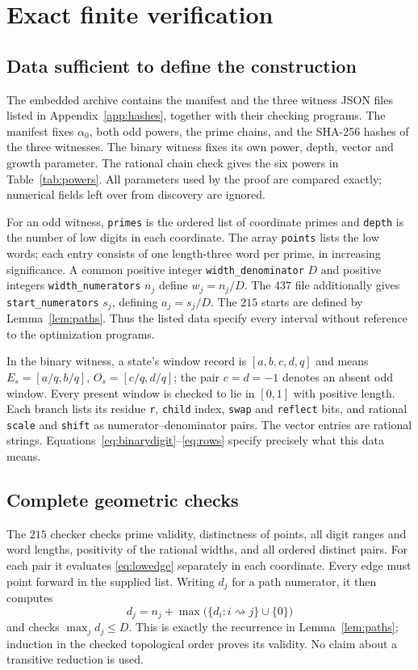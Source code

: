 \documentclass[11pt]{article}
\theoremstyle{definition}
\theoremstyle{remark}
\newcommand{\al}{\alpha_0}
\begin{document}
\section{Exact finite verification}\label{sec:verification}
\subsection{Data sufficient to define the construction}
The embedded archive contains the manifest and the three witness JSON files
listed in Appendix~\ref{app:hashes}, together with their checking programs.
The manifest fixes $\al$, both odd powers, the prime chains, and the
SHA-256 hashes of the three witnesses. The binary witness fixes its own
power, depth, vector and growth parameter. The rational chain check gives
the six powers in Table~\ref{tab:powers}. All parameters used by the proof
are compared exactly; numerical fields left over from discovery are ignored.

For an odd witness, \texttt{primes} is the ordered list of coordinate
primes and \texttt{depth} is the number of low digits in each coordinate.
The array \texttt{points} lists the low words; each entry consists of one
length-three word per prime, in increasing significance. A common positive
integer \texttt{width\_denominator} $D$ and positive integers
\texttt{width\_numerators} $n_j$ define $w_j=n_j/D$.
The $437$ file additionally gives \texttt{start\_numerators} $s_j$,
defining $a_j=s_j/D$. The $215$ starts are defined by
Lemma~\ref{lem:paths}. Thus the listed data specify every interval without
reference to the optimization programs.

In the binary witness, a state's window record is $[a,b,c,d,q]$ and means
$E_s=[a/q,b/q]$, $O_s=[c/q,d/q]$; the pair $c=d=-1$ denotes an absent
odd window. Every present window is checked to lie in $[0,1]$ with positive
length. Each branch lists its residue \texttt{r}, \texttt{child} index,
\texttt{swap} and \texttt{reflect} bits, and rational \texttt{scale} and
\texttt{shift} as numerator--denominator pairs. The vector entries are
rational strings. Equations~\eqref{eq:binarydigit}--\eqref{eq:rows} specify
precisely what this data means.

\subsection{Complete geometric checks}
The $215$ checker checks prime validity, distinctness of points, all digit
ranges and word lengths, positivity of the rational widths, and all
ordered distinct pairs. For each pair it evaluates \eqref{eq:lowedge}
separately in each coordinate. Every edge must point forward in the supplied
list. Writing $d_j$ for a path numerator, it then computes
\[
 d_j=n_j+\max\bigl(\{d_i:i\rightsquigarrow j\}\cup\{0\}\bigr)
\]
and checks $\max_jd_j\le D$. This is exactly the recurrence in
Lemma~\ref{lem:paths}; induction in the checked topological order proves
its validity. No claim about a transitive reduction is used.
\end{document}
